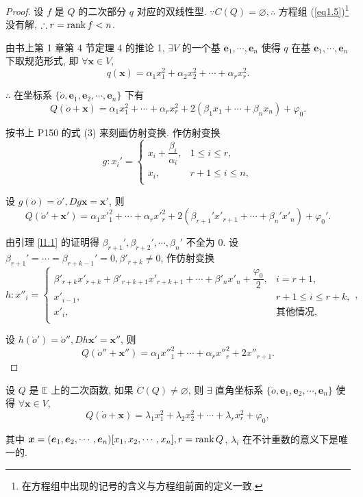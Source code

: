 \documentclass[color=black,device=normal,lang=cn,mode=geye]{elegantnote}
\begin{document}
\begin{proof}
    设 $f$ 是 $Q$ 的二次部分 $q$ 对应的双线性型. $\because C(Q)=\varnothing,\therefore$ 方程组 (\ref{eq1.5})\footnote{在方程组中出现的记号的含义与方程组前面的定义一致.} 没有解, $\therefore r=\operatorname{rank} f<n$.

    由书上第 1 章第 4 节定理 4 的推论 1, $\exists V$ 的一个基 $\boldsymbol{e}_1,\cdots,\boldsymbol{e}_n$ 使得 $q$ 在基 $\boldsymbol{e}_1,\cdots,\boldsymbol{e}_n$ 下取规范形式, 即 $\forall\boldsymbol{x}\in V$,
    \[q(\boldsymbol{x})=\alpha_1x^2_1+\alpha_2x^2_2+\cdots+\alpha_rx^2_r.\]

    $\therefore$ 在坐标系 $\{\dot{o},\boldsymbol{e}_1,\boldsymbol{e}_2,\cdots,\boldsymbol{e}_n\}$ 下有
    \[Q(\dot{o}+\boldsymbol{x})=\alpha_1x^2_1+\cdots+\alpha_rx^2_r+2(\beta_1x_1+\cdots+\beta_nx_n)+\varphi_0.\]

    按书上 P150 的式 (3) 来刻画仿射变换. 作仿射变换
    \[g:x_i'=\begin{cases}
        x_i+\dfrac{\beta_i}{\alpha_i}, & 1\leq i\leq r, \\
        x_i, & r+1\leq i\leq n, \\
    \end{cases}\]

    设 $g(\dot{o})=\dot{o}',Dg\boldsymbol{x}=\boldsymbol{x}'$, 则
    \[Q(\dot{o}'+\boldsymbol{x}')=\alpha_1x'^2_1+\cdots+\alpha_rx'^2_r+2(\beta_{r+1}'x'_{r+1}+\cdots+\beta_n'x'_n)+\varphi_0'.\]

    由引理 \ref{l1.1} 的证明得 $\beta_{r+1}',\beta_{r+2}',\cdots,\beta_n'$ 不全为 $0$. 设 $\beta_{r+1}'=\cdots=\beta_{r+k-1}'=0,\beta'_{r+k}\neq0$, 作仿射变换
    \[h:x''_i=\begin{cases}
        \beta'_{r+k}x'_{r+k}+\beta'_{r+k+1}x'_{r+k+1}+\cdots+\beta'_nx'_n+\dfrac{\varphi_0}{2}, & i=r+1, \\
        x'_{i-1}, & r+1\leq i\leq r+k, \\
        x'_i, & \text{其他情况}, \\
    \end{cases},\]

    设 $h(\dot{o}')=\dot{o}'',Dh\boldsymbol{x}'=\boldsymbol{x}''$, 则
    \[Q(\dot{o}''+\boldsymbol{x}'')=\alpha_1x''^2_1+\cdots+\alpha_rx''^2_r+2x''_{r+1}.\]
\end{proof}
\begin{theorem}
    设 $Q$ 是 $\mathbb{E}$ 上的二次函数, 如果 $C(Q)\neq\varnothing$, 则 $\exists$ 直角坐标系 $\{\dot{o},\boldsymbol{e}_1,\boldsymbol{e}_2,\cdots,\boldsymbol{e}_n\}$ 使得 $\forall\boldsymbol{x}\in V$,
    \[Q(\dot{o}+\boldsymbol{x})=\lambda_1x^2_1+\lambda_2x^2_2+\cdots+\lambda_rx^2_r+\varphi_0,\]

    其中 $\boldsymbol{x}=(\boldsymbol{e}_1,\boldsymbol{e}_2,\cdots,\boldsymbol{e}_n)[x_1,x_2,\cdots,x_n],r=\operatorname{rank} Q$, $\lambda_i$ 在不计重数的意义下是唯一的.
\end{theorem}
\end{document}
